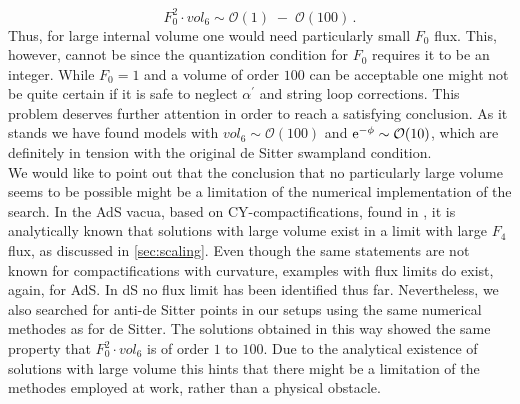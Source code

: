 \documentclass[a4paper,12pt]{report}
\newcommand{\be}{\begin{equation}}
\newcommand{\ee}{\end{equation}}
\def\rme{{\rm e}}
\begin{document}
\be 
F_0^2 \cdot vol_6 \sim \mathcal{O}(1) \; - \; \mathcal{O}(100)\,.
\ee
Thus, for large internal volume one would need particularly small $F_0$ flux. This, however, cannot be since the quantization condition for $F_0$ requires it to be an integer. While $F_0=1$ and a volume of order $100$ can be acceptable one might not be quite certain if it is safe to neglect $\alpha^ \prime$ and string loop corrections. This problem deserves further attention in order to reach a satisfying conclusion. As it stands we have found models with $vol_6 \sim \mathcal{O}(100)$ and $\rme^ {-\phi} \sim \mathcal{O}(10)$, which are definitely in tension with the original de Sitter swampland condition.\\
We would like to point out that the conclusion that no particularly large volume seems to be possible might be a limitation of the numerical implementation of the search. In the AdS vacua, based on CY-compactifications, found in \cite{DeWolfe:2005uu}, it is analytically known that solutions with large volume exist in a limit with large $F_4$ flux, as discussed in \ref{sec:scaling}. Even though the same statements are not known for compactifications with curvature, examples with flux limits do exist, again, for AdS. In dS no flux limit has been identified thus far. Nevertheless, we also searched for anti-de Sitter points in our setups using the same numerical methodes as for de Sitter. The solutions obtained in this way showed the same property that $F_0^ 2 \cdot vol_6$ is of order $1$ to $100$. Due to the analytical existence of solutions with large volume this hints that there might be a limitation of the methodes employed at work, rather than a physical obstacle.
\end{document}
